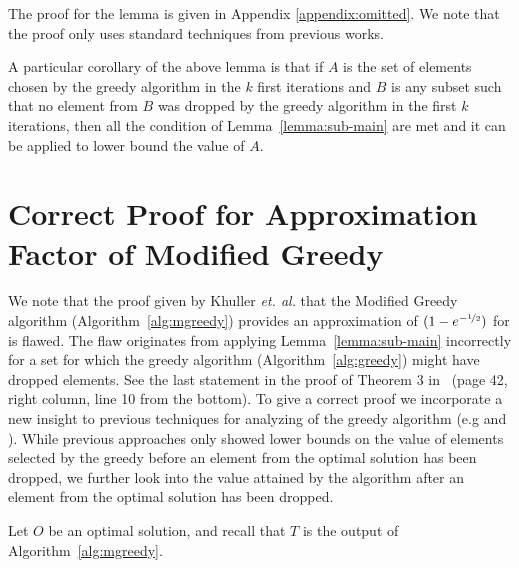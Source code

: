 \documentclass[a4paper]{article}
\begin{document}
The proof for the lemma is given in Appendix  \ref{appendix:omitted}. We note that 
the proof only uses standard techniques from previous works.

A particular corollary of the above lemma is that if $A$ is the set of elements chosen by the greedy algorithm in
the $k$ first iterations and $B$ is any subset such that no element from $B$ was dropped by the greedy algorithm in the first $k$ iterations,
then all the condition of Lemma~\ref{lemma:sub-main} are met and it can be applied to lower bound the value of $A$.







\section{Correct Proof for Approximation Factor of Modified Greedy}\label{sec:ModifiedGreedy}
We note that the proof given by Khuller {\em et. al.} \cite{khuller1999budgeted} that the Modified Greedy algorithm (Algorithm~\ref{alg:mgreedy}) provides an approximation of $ (1-e^{-\nicefrac[]{1}{2}})$ for \SK is flawed.
{{The flaw originates from applying Lemma~\ref{lemma:sub-main} incorrectly for a set for which the greedy algorithm (Algorithm~\ref{alg:greedy}) might have dropped elements.
See the last statement in the proof of Theorem 3 in~\cite{khuller1999budgeted} (page 42, right column, line 10 from the bottom).}}
To give a correct proof we incorporate a new insight to
previous techniques for analyzing of the greedy algorithm
(e.g \cite{khuller1999budgeted} and \cite{LB10}). While previous approaches only
showed lower
bounds on the value of elements selected by the greedy before an
 element from the optimal solution has been dropped, we
further look into the value attained by the algorithm after
an element from the optimal solution has been dropped.

Let $O$ be an optimal solution, and recall that $T$ is the output of Algorithm~\ref{alg:mgreedy}.


\end{document}
